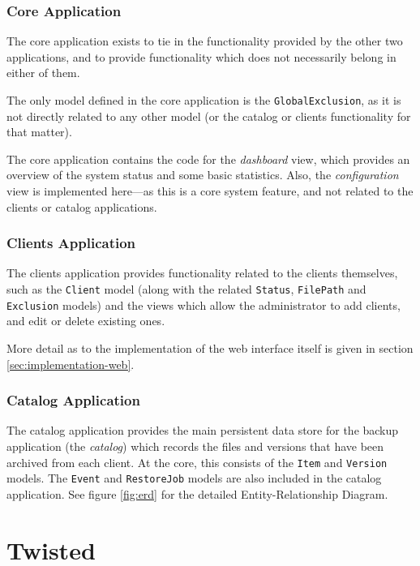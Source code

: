 \subsubsection{Core Application}
\label{sec:implementation-django-structure-core}

The core application exists to tie in the functionality provided by the other
two applications, and to provide functionality which does not necessarily
belong in either of them.

The only model defined in the core application is the \verb!GlobalExclusion!,
as it is not directly related to any other model (or the catalog or clients
functionality for that matter).

The core application contains the code for the \emph{dashboard} view, which
provides an overview of the system status and some basic statistics. Also, the
\emph{configuration} view is implemented here---as this is a core system
feature, and not related to the clients or catalog applications.

\subsubsection{Clients Application}
\label{sec:implementation-django-structure-clients}

The clients application provides functionality related to the clients
themselves, such as the \verb!Client! model (along with the related
\verb!Status!, \verb!FilePath! and \verb!Exclusion! models) and the views which
allow the administrator to add clients, and edit or delete existing ones.

More detail as to the implementation of the web interface itself is given in
section \ref{sec:implementation-web}.

\subsubsection{Catalog Application}
\label{sec:implementation-django-structure-catalog}

The catalog application provides the main persistent data store for the backup
application (the \emph{catalog}) which records the files and versions that have
been archived from each client. At the core, this consists of the \verb!Item!
and \verb!Version! models. The \verb!Event! and \verb!RestoreJob! models are
also included in the catalog application. See figure \ref{fig:erd} for the
detailed Entity-Relationship Diagram.

\section{Twisted}
\label{sec:implementation-twisted}

